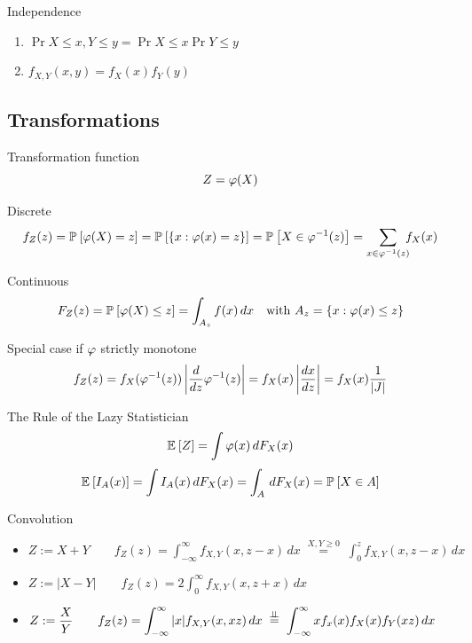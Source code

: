 \documentclass[landscape]{article}
\begin{document}
\begin{multicols*}{2}
Independence
\begin{enumerate}
  \item $\Pr{X \le x, Y \le y} = \Pr{X \le x}\Pr{Y \le y}$
  \item $f_{X,Y}(x,y) = f_X(x)f_Y(y)$
\end{enumerate}

\subsection{Transformations}

Transformation function
\[Z = \varphi(X)\]

Discrete
\[f_Z(z) = \mathbb{P}_{}\left[\varphi(X) = z\right] = \mathbb{P}_{}\left[\{x:\varphi(x) = z\}\right]
= \mathbb{P}_{}\left[X \in \varphi^{-1}(z)\right] = \sum_{x \in \varphi^{-1}(z)} \!\!\!f_X(x)\]

Continuous
\[F_Z(z) = \mathbb{P}_{}\left[\varphi(X) \le z\right] = \int_{A_z} f(x) \,dx \quad
    \text{with } A_z = \{x:\varphi(x) \le z\}\]

Special case if $\varphi$ strictly monotone
\[f_Z(z)
    = f_X(\varphi^{-1}(z))
      \left|\frac{d}{dz}\varphi^{-1}(z)\right|
    = f_X(x)\left|\frac{dx}{dz}\right|
    = f_X(x)\frac{1}{|J|}\]

The Rule of the Lazy Statistician
\[\mathbb{E}_{}\left[Z\right] = \int \varphi(x) \,dF_X(x)\]
\[\mathbb{E}_{}\left[I_A(x)\right] = \int I_A(x) \,dF_X(x) = \int_A \,dF_X(x) = \mathbb{P}_{}\left[X \in A\right]\]

Convolution
\begin{itemize}
  \item $ Z:=X+Y \qquad
    f_Z(z)=\displaystyle\int_{-\infty}^{\infty} f_{X,Y}(x,z-x)\,dx
    \;\stackrel{X,Y \ge 0}{=}\; \int_0^z f_{X,Y}(x,z-x)\,dx$
  \item $ Z:=|X-Y| \qquad
    f_Z(z)=\displaystyle2\int_0^\infty f_{X,Y}(x,z+x)\,dx$
  \item $ Z:=\displaystyle\frac{X}{Y} \qquad
    f_Z(z)=\displaystyle\int_{-\infty}^{\infty} |x| f_{X,Y}(x,xz)\,dx
    \;\stackrel{\perp\!\!\!\perp}{=}\; \int_{-\infty}^{\infty} xf_x(x)f_X(x)f_Y(xz)\,dx$
\end{itemize}



\end{multicols*}
\end{document}
